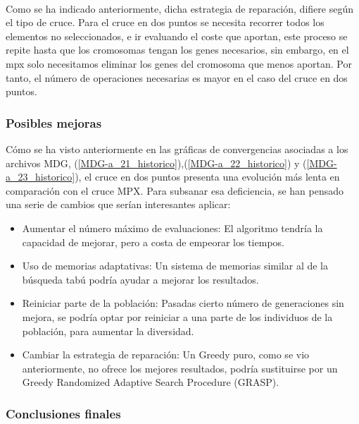 	\paragraph{}Como se ha indicado anteriormente, dicha estrategia de reparación, difiere según el tipo de cruce. Para el cruce en dos puntos se necesita recorrer todos los elementos no seleccionados, e ir evaluando el coste que aportan, este proceso se repite hasta que los cromosomas tengan los genes necesarios, sin embargo, en el mpx solo necesitamos eliminar los genes del cromosoma que menos aportan. Por tanto, el número de operaciones necesarias es mayor en el caso del cruce en dos puntos.
	
	
	\subsubsection{Posibles mejoras}
	
	Cómo se ha visto anteriormente en las gráficas de convergencias asociadas a los archivos MDG, (\ref{MDG-a_21_historico}),(\ref{MDG-a_22_historico}) y (\ref{MDG-a_23_historico}), el cruce en dos puntos presenta una evolución más lenta en comparación con el cruce MPX. Para subsanar esa deficiencia, se han pensado una serie de cambios que serían interesantes aplicar:
	
	\begin{itemize}
		\item Aumentar el número máximo de evaluaciones: El algoritmo tendría la capacidad de mejorar, pero a costa de empeorar los tiempos.
		\item Uso de memorias adaptativas: Un sistema de memorias similar al de la búsqueda tabú podría ayudar a mejorar los resultados.
		\item Reiniciar parte de la población: Pasadas cierto número de generaciones sin mejora, se podría optar por reiniciar a una parte de los individuos de la población, para aumentar la diversidad.
		\item Cambiar la estrategia de reparación: Un Greedy puro, como se vio anteriormente, no ofrece los mejores resultados, podría sustituirse por un Greedy Randomized Adaptive Search Procedure (GRASP).
		
	\end{itemize} 
	
	
	\subsubsection{Conclusiones finales}
	
